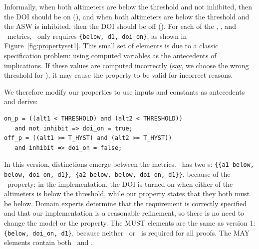 \noindent Informally, when both altimeters are below the threshold and not inhibited, then the DOI should be on (\onp), and when both altimeters are below the threshold and the ASW is inhibited, then the DOI should be off (\offp).
For each of the \ivccov, \maycov, and \mustcov\ metrics, \allp\ only requires \texttt{\{below, d1, doi\_on\}}, as shown in Figure~\ref{fig:propertyset1}.   This small set of elements is due to a classic specification problem: using computed variables as the antecedents of implications.  If these values are computed incorrectly (say, we choose the wrong threshold for \aonebelow), it may cause the property to be valid for incorrect reasons.


We therefore modify our properties to use inputs and constants as antecedents and derive:

{\smaller
\begin{verbatim}
on_p = ((alt1 < THRESHOLD) and (alt2 < THRESHOLD))
   and not inhibit => doi_on = true;
off_p = ((alt1 >= T_HYST) and (alt2 >= T_HYST))
   and inhibit => doi_on = false;
\end{verbatim}
}

\noindent In this version, distinctions emerge between the metrics.  \allp\ has two \mivc s: \texttt{\{\{a1\_below, below, doi\_on, d1\}, \{a2\_below, below, doi\_on, d1\}\}}, because of the \onp\ property: in the implementation, the DOI is turned on when either of the altimeters is below the threshold, while our property states that they both must be below.
Domain experts determine that the requirement is correctly specified and that our implementation is a reasonable refinement, so there is no need to change the model or the property.  The MUST elements are the same as version 1: \texttt{\{below, doi\_on, d1\}}, because neither \aonebelow\ or \atwobelow\ is required for all proofs.  %
The MAY elements contain both \aonebelow\ and \atwobelow.

